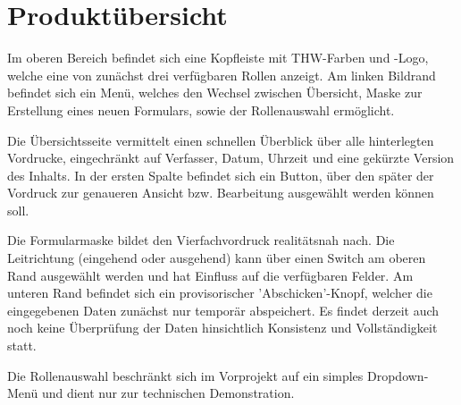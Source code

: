 \section{Produktübersicht}
\label{sec:produktubersicht}

  Im oberen Bereich befindet sich eine Kopfleiste mit THW-Farben und -Logo, welche eine von
  zunächst drei verfügbaren Rollen anzeigt. Am linken Bildrand befindet sich ein Menü,
  welches den Wechsel zwischen Übersicht, Maske zur Erstellung eines neuen Formulars, sowie
  der Rollenauswahl ermöglicht.

  Die Übersichtsseite vermittelt einen schnellen Überblick über alle hinterlegten Vordrucke,
  eingechränkt auf Verfasser, Datum, Uhrzeit und eine gekürzte Version des Inhalts. In der
  ersten Spalte befindet sich ein Button, über den später der Vordruck zur genaueren Ansicht
  bzw. Bearbeitung ausgewählt werden können soll.

  Die Formularmaske bildet den Vierfachvordruck realitätsnah nach. Die Leitrichtung (eingehend
  oder ausgehend) kann über einen Switch am oberen Rand ausgewählt werden und hat Einfluss
  auf die verfügbaren Felder. Am unteren Rand befindet sich ein provisorischer 'Abschicken'-Knopf,
  welcher die eingegebenen Daten zunächst nur temporär abspeichert. Es findet derzeit auch noch
  keine Überprüfung der Daten hinsichtlich Konsistenz und Vollständigkeit statt.

  Die Rollenauswahl beschränkt sich im Vorprojekt auf ein simples Dropdown-Menü und dient
  nur zur technischen Demonstration.
